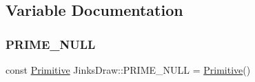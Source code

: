 \subsection{Variable Documentation}
\mbox{\label{namespace_jinks_draw_a1d4bdcc49484a3abfad71c82b5c56225}} 
\subsubsection{\texorpdfstring{P\+R\+I\+M\+E\+\_\+\+N\+U\+LL}{PRIME\_NULL}}
{\footnotesize\ttfamily const \mbox{\hyperlink{class_jinks_draw_1_1_primitive}{Primitive}} Jinks\+Draw\+::\+P\+R\+I\+M\+E\+\_\+\+N\+U\+LL = \mbox{\hyperlink{class_jinks_draw_1_1_primitive}{Primitive}}()}

